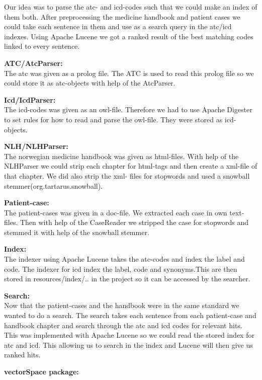 Our idea was to parse the atc- and icd-codes such that we could make an index of them both. After preprocessing the medicine handbook and patient cases we could take each sentence in them and use as a search query in the atc/icd indexes. Using Apache Lucene we got a ranked result of the best matching codes linked to every sentence. 

\begin{description}
\item{\textbf{ATC/AtcParser:}} \\
The atc was given as a prolog file. The ATC is used to read this prolog file so we could store it as atc-objects with help of the AtcParser.
\item{\textbf{Icd/IcdParser:}} \\
The icd-codes was given as an owl-file. Therefore we had to use Apache Digester to set rules for how to read and parse the owl-file. They were stored as icd-objects. 
\item{\textbf{NLH/NLHParser:}} \\
The norwegian medicine handbook was given as html-files. With help of the NLHParser we could strip each chapter for html-tags and then create a xml-file of that chapter. We did also strip the xml- files for stopwords and used a snowball stemmer(org.tartarus.snowball).
\item{\textbf{Patient-case:}} \\
The patient-cases was given in a doc-file. We extracted each case in own text-files. Then with help of the CaseReader we stripped the case for stopwords and stemmed it with help of the snowball stemmer. 
\item{\textbf{Index:}} \\
The indexer using Apache Lucene takes the atc-codes and index the label and code. The indexer for icd index the label, code and synonyms.This are then stored in resources/index/.. in the project so it can be accessed by the searcher. 
\item{\textbf{Search:}} \\
Now that the patient-cases and the handbook were in the same standard we wanted to do a search. The search takes each sentence from each patient-case and handbook chapter and search through the atc and icd codes for relevant hits. This was implemented with Apache Lucene so we could read the stored index for atc and icd. This allowing us to search in the index and Lucene will then give us ranked hits. 
\item{\textbf{vectorSpace package:}} \\

\end{description}
